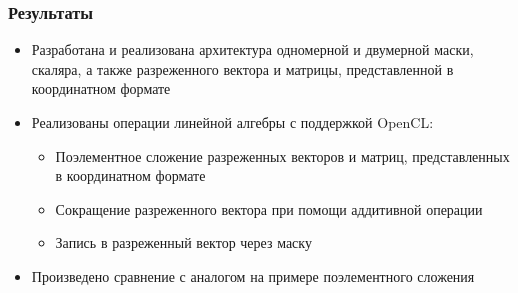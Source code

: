 \documentclass{beamer}
\begin{document}
\begin{frame}
  \frametitle{Результаты}
  \begin{itemize}
    \item Разработана и реализована архитектура одномерной и двумерной маски, скаляра, а также разреженного вектора и матрицы, представленной в координатном формате
    \item Реализованы операции линейной алгебры с поддержкой OpenCL:
    \begin{itemize}
        \item Поэлементное сложение разреженных векторов и матриц, представленных в координатном формате
        \item Сокращение разреженного вектора при помощи аддитивной операции
        \item Запись в разреженный вектор через маску
    \end{itemize}
    \item Произведено сравнение с аналогом на примере поэлементного сложения
  \end{itemize}
\end{frame}
\end{document}

